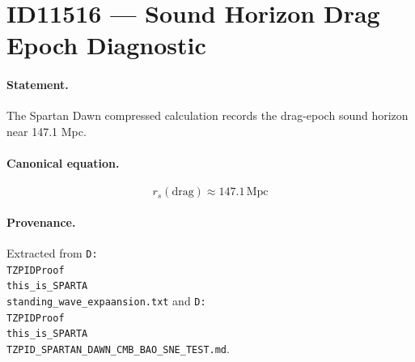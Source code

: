 \section*{ID11516 --- Sound Horizon Drag Epoch Diagnostic}

\paragraph{Statement.}
The Spartan Dawn compressed calculation records the drag-epoch sound horizon near 147.1 Mpc.

\paragraph{Canonical equation.}
\[
r_s(\mathrm{drag})\approx147.1\,\mathrm{Mpc}
\]

\paragraph{Provenance.}
Extracted from \texttt{D:\\TZPIDProof\\this\_is\_SPARTA\\standing\_wave\_expaansion.txt} and \texttt{D:\\TZPIDProof\\this\_is\_SPARTA\\TZPID\_SPARTAN\_DAWN\_CMB\_BAO\_SNE\_TEST.md}.
